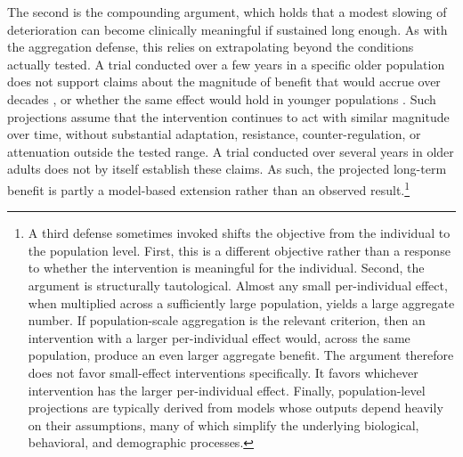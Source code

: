 \documentclass[twocolumn]{article} %
\begin{document}
The second is the compounding argument, which holds that a modest slowing of deterioration can become clinically meaningful if sustained long enough. As with the aggregation defense, this relies on extrapolating beyond the conditions actually tested. A trial conducted over a few years in a specific older population does not support claims about the magnitude of benefit that would accrue over decades \citep[b]{keys2025emerging}, or whether the same effect would hold in younger populations \citep[c]{rolland2023challenges}. Such projections assume that the intervention continues to act with similar magnitude over time, without substantial adaptation, resistance, counter-regulation, or attenuation outside the tested range. A trial conducted over several years in older adults does not by itself establish these claims. As such, the projected long-term benefit is partly a model-based extension rather than an observed result.\footnote{A third defense sometimes invoked shifts the objective from the individual to the population level. First, this is a different objective rather than a response to whether the intervention is meaningful for the individual. Second, the argument is structurally tautological. Almost any small per-individual effect, when multiplied across a sufficiently large population, yields a large aggregate number. If population-scale aggregation is the relevant criterion, then an intervention with a larger per-individual effect would, across the same population, produce an even larger aggregate benefit. The argument therefore does not favor small-effect interventions specifically. It favors whichever intervention has the larger per-individual effect. Finally, population-level projections are typically derived from models whose outputs depend heavily on their assumptions, many of which simplify the underlying biological, behavioral, and demographic processes.}
\end{document}
